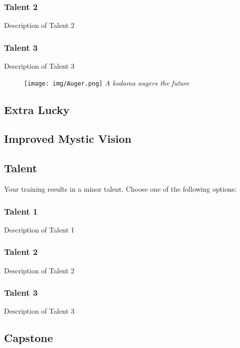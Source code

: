 \subsubsection{Talent 2}
Description of Talent 2

\subsubsection{Talent 3}
Description of Talent 3

\vspace{.1 in}

\begin{figure}[ht!]
	\texttt{[image: img/Auger.png]}
	\centering
	\textit{A kodama augers the future}
\end{figure}

\subsection*{Extra Lucky}
\lipsum[1]

\vspace{.1 in}

\subsection*{Improved Mystic Vision}
\lipsum[1]

\vspace{.1 in}

\subsection*{Talent}
Your training results in a minor talent. Choose one of the following options:

\subsubsection{Talent 1}
Description of Talent 1

\subsubsection{Talent 2}
Description of Talent 2

\subsubsection{Talent 3}
Description of Talent 3

\vspace{.1 in}

\subsection*{Capstone}
\lipsum[1]